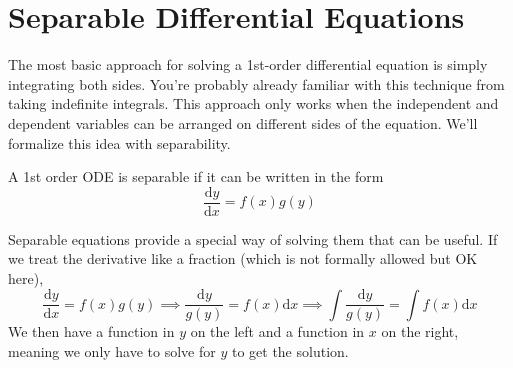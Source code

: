 \section{Separable Differential Equations}
\noindent
The most basic approach for solving a 1st-order differential equation is simply integrating both sides. You're probably already familiar with this technique from taking indefinite integrals. This approach only works when the independent and dependent variables can be arranged on different sides of the equation. We'll formalize this idea with separability.

\begin{definition}
	A 1st order ODE is separable if it can be written in the form
	\begin{equation*}
		\frac{\mathrm{d} y}{\mathrm{d} x} = f(x)g(y)
	\end{equation*}
\end{definition}

\noindent
Separable equations provide a special way of solving them that can be useful. If we treat the derivative like a fraction (which is not formally allowed but OK here),
\begin{equation*}
	\frac{\mathrm{d} y}{\mathrm{d} x} = f(x)g(y) \implies \frac{\mathrm{d} y}{g(y)} = f(x) \mathrm{d}x \implies \int{\frac{\mathrm{d} y}{g(y)}} = \int{f(x) \mathrm{d}x}
\end{equation*}
We then have a function in $y$ on the left and a function in $x$ on the right, meaning we only have to solve for $y$ to get the solution.

\ifodd{}\fi
